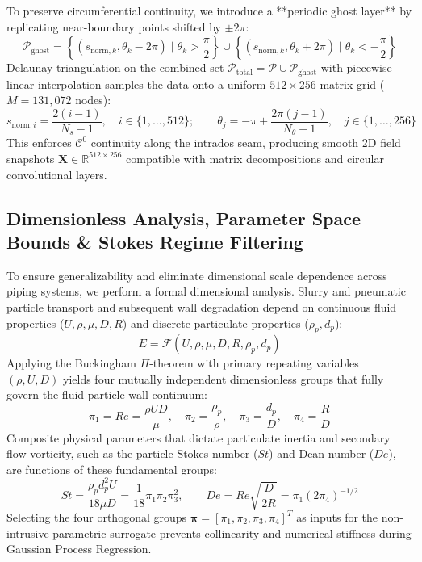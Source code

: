 \documentclass{article}
\newcommand{\real}{\mathbb{R}}
\begin{document}
To preserve circumferential continuity, we introduce a **periodic ghost layer** by replicating near-boundary points shifted by $\pm 2\pi$:
\begin{equation}
    \mathcal{P}_{\text{ghost}} = \left\{ (s_{\text{norm}, k}, \theta_k - 2\pi) \;\Big|\; \theta_k > \frac{\pi}{2} \right\} \cup \left\{ (s_{\text{norm}, k}, \theta_k + 2\pi) \;\Big|\; \theta_k < -\frac{\pi}{2} \right\}
    \label{eq:ghost_padding}
\end{equation}
Delaunay triangulation on the combined set $\mathcal{P}_{\text{total}} = \mathcal{P} \cup \mathcal{P}_{\text{ghost}}$ with piecewise-linear interpolation samples the data onto a uniform $512 \times 256$ matrix grid ($M = 131,072$ nodes):
\begin{equation}
    s_{\text{norm}, i} = \frac{2(i-1)}{N_s - 1}, \quad i \in \{1, \dots, 512\}; \qquad \theta_j = -\pi + \frac{2\pi(j-1)}{N_\theta - 1}, \quad j \in \{1, \dots, 256\}
    \label{eq:tensor_grid}
\end{equation}
This enforces $\mathcal{C}^0$ continuity along the intrados seam, producing smooth 2D field snapshots $\mathbf{X} \in \real^{512 \times 256}$ compatible with matrix decompositions and circular convolutional layers.



\subsection{Dimensionless Analysis, Parameter Space Bounds \& Stokes Regime Filtering}
\label{sec:dimensionless_space}

To ensure generalizability and eliminate dimensional scale dependence across piping systems, we perform a formal dimensional analysis. Slurry and pneumatic particle transport and subsequent wall degradation depend on continuous fluid properties ($U, \rho, \mu, D, R$) and discrete particulate properties ($\rho_p, d_p$):
\begin{equation}
    E = \mathcal{F}(U, \rho, \mu, D, R, \rho_p, d_p)
    \label{eq:erosion_functional}
\end{equation}
Applying the Buckingham $\Pi$-theorem with primary repeating variables $(\rho, U, D)$ yields four mutually independent dimensionless groups that fully govern the fluid-particle-wall continuum:
\begin{equation}
    \pi_1 = Re = \frac{\rho U D}{\mu}, \quad \pi_2 = \frac{\rho_p}{\rho}, \quad \pi_3 = \frac{d_p}{D}, \quad \pi_4 = \frac{R}{D}
    \label{eq:pi_groups}
\end{equation}
Composite physical parameters that dictate particulate inertia and secondary flow vorticity, such as the particle Stokes number ($St$) and Dean number ($De$), are functions of these fundamental groups:
\begin{equation}
    St = \frac{\rho_p d_p^2 U}{18 \mu D} = \frac{1}{18} \pi_1 \pi_2 \pi_3^2, \qquad De = Re \sqrt{\frac{D}{2R}} = \pi_1 (2\pi_4)^{-1/2}
    \label{eq:stokes_dean}
\end{equation}
Selecting the four orthogonal groups $\bm{\pi} = [\pi_1, \pi_2, \pi_3, \pi_4]^T$ as inputs for the non-intrusive parametric surrogate prevents collinearity and numerical stiffness during Gaussian Process Regression.
\end{document}
